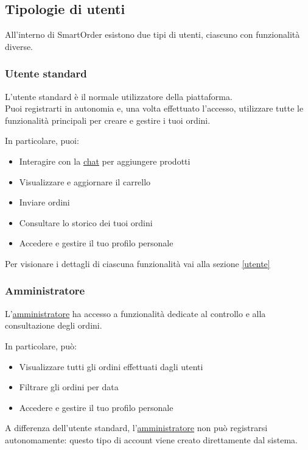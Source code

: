 \subsection{Tipologie di utenti}

All'interno di SmartOrder esistono due tipi di utenti, ciascuno con funzionalit\`a diverse.

\subsubsection{Utente standard}

L'utente standard \`e il normale utilizzatore della piattaforma.\\
Puoi registrarti in autonomia e, una volta effettuato l'accesso, utilizzare tutte le funzionalit\`a principali per creare e gestire i tuoi ordini.

In particolare, puoi:
\begin{itemize}[itemsep=5pt, parsep=5pt, label=$\scriptstyle\bullet$]
	\item Interagire con la \hyperlink{glossario:chat}{chat} per aggiungere prodotti
	\item Visualizzare e aggiornare il carrello
	\item Inviare ordini
	\item Consultare lo storico dei tuoi ordini
	\item Accedere e gestire il tuo profilo personale
\end{itemize}
Per visionare i dettagli di ciascuna funzionalità vai alla sezione \ref{utente}
\subsubsection{Amministratore}

L'\hyperlink{glossario:amministratore}{amministratore} ha accesso a funzionalit\`a dedicate al controllo e alla consultazione degli ordini.

In particolare, pu\`o:
\begin{itemize}[itemsep=5pt, parsep=5pt, label=$\scriptstyle\bullet$]
	\item Visualizzare tutti gli ordini effettuati dagli utenti
	\item Filtrare gli ordini per data
	\item Accedere e gestire il tuo profilo personale
\end{itemize}

A differenza dell'utente standard, l'\hyperlink{glossario:amministratore}{amministratore} non pu\`o registrarsi autonomamente: questo tipo di account viene creato direttamente dal sistema.\vspace{0.5em}

